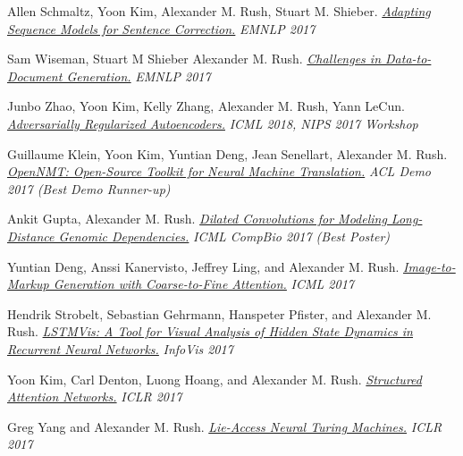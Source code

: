 \documentclass[10pt]{article}
\begin{document}
\medskip


\ind Allen Schmaltz, Yoon Kim, Alexander M. Rush, Stuart M. Shieber. \emph{\href{ https://arxiv.org/abs/1707.09067 }{ Adapting Sequence Models for Sentence Correction.} }\emph{ EMNLP 2017 }

\medskip


\ind Sam Wiseman, Stuart M Shieber Alexander M. Rush. \emph{\href{ https://arxiv.org/abs/1707.08052 }{ Challenges in Data-to-Document Generation.} }\emph{ EMNLP 2017 }

\medskip


\ind Junbo Zhao, Yoon Kim, Kelly Zhang, Alexander M. Rush, Yann LeCun. \emph{\href{ https://arxiv.org/abs/1706.04223 }{ Adversarially Regularized Autoencoders.} }\emph{ ICML 2018, NIPS 2017 Workshop }

\medskip


\ind Guillaume Klein, Yoon Kim, Yuntian Deng, Jean Senellart, Alexander M. Rush. \emph{\href{ https://arxiv.org/abs/1701.02810 }{ OpenNMT: Open-Source Toolkit for Neural Machine Translation.} }\emph{ ACL Demo 2017 (Best Demo Runner-up) }

\medskip


\ind Ankit Gupta, Alexander M. Rush. \emph{\href{ https://arxiv.org/abs/1710.01278 }{ Dilated Convolutions for Modeling Long-Distance Genomic Dependencies.} }\emph{ ICML CompBio 2017 (Best Poster) }

\medskip


\ind Yuntian Deng, Anssi Kanervisto, Jeffrey Ling, and Alexander M. Rush. \emph{\href{ http://lstm.seas.harvard.edu/latex/ }{ Image-to-Markup Generation with Coarse-to-Fine Attention.} }\emph{ ICML 2017 }

\medskip


\ind Hendrik Strobelt, Sebastian Gehrmann, Hanspeter Pfister, and Alexander M. Rush. \emph{\href{ http://lstm.seas.harvard.edu/ }{ LSTMVis: A Tool for Visual Analysis of Hidden State Dynamics in Recurrent Neural Networks.} }\emph{ InfoVis 2017 }

\medskip


\ind Yoon Kim, Carl Denton, Luong Hoang, and Alexander M. Rush. \emph{\href{ https://arxiv.org/abs/1702.00887 }{ Structured Attention Networks.} }\emph{ ICLR 2017 }

\medskip


\ind Greg Yang and Alexander M. Rush. \emph{\href{ http://lstm.seas.harvard.edu/lantm/ }{ Lie-Access Neural Turing Machines.} }\emph{ ICLR 2017 }

\medskip
\end{document}
